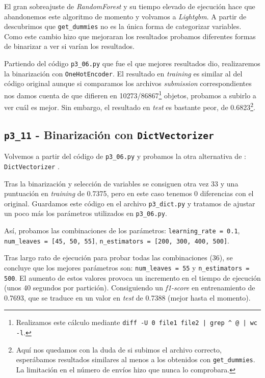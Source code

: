\documentclass[a4paper, 20pt]{article}
\begin{document}
El gran sobreajuste de \textit{RandomForest} y su tiempo elevado de ejecución hace que abandonemos este algoritmo de momento y volvamos a \textit{Lightgbm}.
A partir de \cite{noauthor_richters_nodate} descubrimos que \texttt{get\_dummies} no es la única forma de categorizar variables. Como este cambio hizo que mejoraran los resultados probamos diferentes formas de binarizar \cite{liu_encoding_2018} a ver si varían los resultados.

Partiendo del código \texttt{p3\_06.py} que fue el que mejores resultados dio, realizaremos la binarización con \texttt{OneHotEncoder}.
El resultado en \textit{training} es similar al del código original aunque si comparamos los archivos \textit{submission} correspondientes nos damos cuenta de que difieren en 10273/86867\footnote{Realizamos este cálculo mediante \texttt{diff -U 0 file1 file2 | grep \^{} @ | wc -l}.} objetos, probamos a subirlo a ver cuál es mejor. Sin embargo, el resultado en \textit{test} es bastante peor, de 0.6823\footnote{Aquí nos quedamos con la duda de si subimos el archivo correcto, esperábamos resultados similares al menos a los obtenidos con \texttt{get\_dummies}. La limitación en el número de envíos hizo que nunca lo comprobara.}.

\subsection{\texttt{p3\_11} - Binarización con \texttt{DictVectorizer}}

Volvemos a partir del código de \texttt{p3\_06.py} y probamos la otra alternativa de \cite{liu_encoding_2018}: \texttt{DictVectorizer} \cite{noauthor_sklearn.feature_extraction.dictvectorizer_nodate}.

Tras la binarización y selección de variables se consiguen otra vez 33 y una puntuación en \textit{training} de 0.7375, pero en este caso tenemos 0 diferencias con el original. Guardamos este código en el archivo \texttt{p3\_dict.py} y tratamos de ajustar un poco más los parámetros utilizados en \texttt{p3\_06.py}.

Así, probamos las combinaciones de los parámetros: \texttt{learning\_rate = 0.1}, \texttt{num\_leaves = [45, 50, 55]}, \texttt{n\_estimators = [200, 300, 400, 500]}.

Tras largo rato de ejecución para probar todas las combinaciones (36), se concluye que los mejores parámetros son: \texttt{num\_leaves = 55} y \texttt{n\_estimators = 500}. El aumento de estos valores provoca un incremento en el tiempo de ejecución (unos 40 segundos por partición). Consiguiendo un \textit{f1-score} en entrenamiento de 0.7693, que se traduce en un valor en \textit{test} de 0.7388 (mejor hasta el momento).
\end{document}

